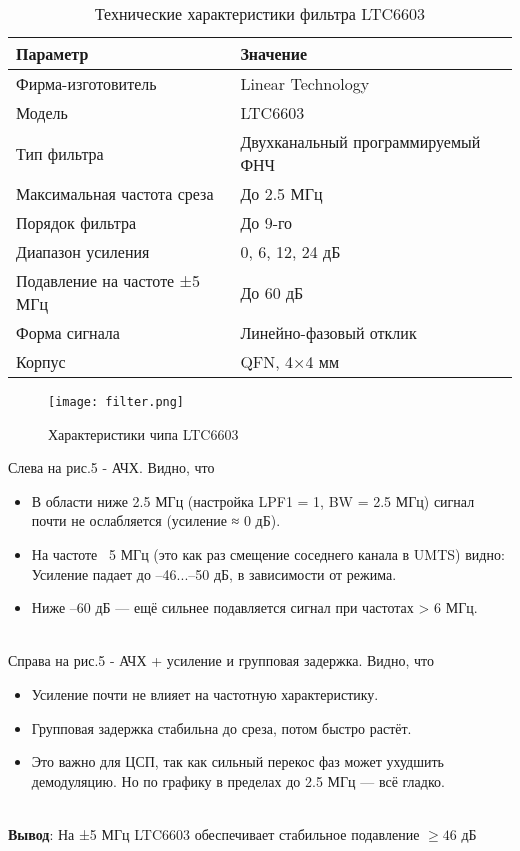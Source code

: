 \documentclass[a4paper,12pt]{article}
\begin{document}
\begin{table}[H]
\centering
\caption{Технические характеристики фильтра LTC6603}
\begin{tabular}{|l|l|}
\hline
\textbf{Параметр} & \textbf{Значение} \\ \hline
Фирма-изготовитель & Linear Technology \\ \hline
Модель & LTC6603 \\ \hline
Тип фильтра & Двухканальный программируемый ФНЧ \\ \hline
Максимальная частота среза & До 2.5 МГц \\ \hline
Порядок фильтра & До 9-го \\ \hline
Диапазон усиления & 0, 6, 12, 24 дБ \\ \hline
Подавление на частоте ±5 МГц & До 60 дБ \\ \hline
Форма сигнала & Линейно-фазовый отклик \\ \hline
Корпус & QFN, 4×4 мм \\ \hline
\end{tabular}
\end{table}


\begin{figure}[H]
    \centering
    \texttt{[image: filter.png]}
    \caption{Характеристики чипа LTC6603}
    \label{fig:enter-label}
\end{figure}

Слева на рис.5 - АЧХ. Видно, что 
\begin{itemize}
\item В области ниже 2.5 МГц (настройка LPF1 = 1, BW = 2.5 МГц) сигнал почти не ослабляется (усиление ≈ 0 дБ).
\item На частоте ~5 МГц (это как раз смещение соседнего канала в UMTS) видно:
Усиление падает до –46...–50 дБ, в зависимости от режима.
\item Ниже –60 дБ — ещё сильнее подавляется сигнал при частотах > 6 МГц.
\end{itemize}

\\
Справа на рис.5 - АЧХ + усиление и групповая задержка. Видно, что 
\begin{itemize}
\item Усиление почти не влияет на частотную характеристику.
\item Групповая задержка стабильна до среза, потом быстро растёт.
\item Это важно для ЦСП, так как сильный перекос фаз может ухудшить демодуляцию. Но по графику в пределах до 2.5 МГц — всё гладко.
\end{itemize}
\\
\textbf{Вывод}: На ±5 МГц LTC6603 обеспечивает стабильное подавление $≥ 46$ дБ\\
\end{document}
